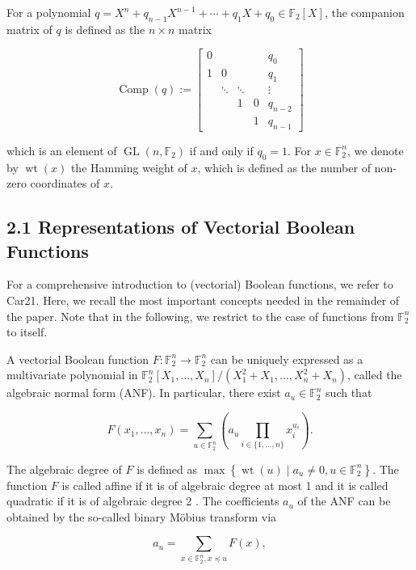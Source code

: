 \documentclass[10pt]{article}
\begin{document}
For a polynomial $q=X^{n}+q_{n-1} X^{n-1}+\cdots+q_{1} X+q_{0} \in \mathbb{F}_{2}[X]$, the companion matrix of $q$ is defined as the $n \times n$ matrix

$$
\operatorname{Comp}(q):=\left[\begin{array}{ccccc}
0 & & & & q_{0} \\
1 & 0 & & & q_{1} \\
& \ddots & \ddots & & \vdots \\
& & 1 & 0 & q_{n-2} \\
& & & 1 & q_{n-1}
\end{array}\right]
$$

which is an element of $\operatorname{GL}\left(n, \mathbb{F}_{2}\right)$ if and only if $q_{0}=1$. For $x \in \mathbb{F}_{2}^{n}$, we denote by $\operatorname{wt}(x)$ the Hamming weight of $x$, which is defined as the number of non-zero coordinates of $x$.

\subsection*{2.1 Representations of Vectorial Boolean Functions}
For a comprehensive introduction to (vectorial) Boolean functions, we refer to Car21. Here, we recall the most important concepts needed in the remainder of the paper. Note that in the following, we restrict to the case of functions from $\mathbb{F}_{2}^{n}$ to itself.

A vectorial Boolean function $F: \mathbb{F}_{2}^{n} \rightarrow \mathbb{F}_{2}^{n}$ can be uniquely expressed as a multivariate polynomial in $\mathbb{F}_{2}^{n}\left[X_{1}, \ldots, X_{n}\right] /\left(X_{1}^{2}+X_{1}, \ldots, X_{n}^{2}+X_{n}\right)$, called the algebraic normal form (ANF). In particular, there exist $a_{u} \in \mathbb{F}_{2}^{n}$ such that

$$
F\left(x_{1}, \ldots, x_{n}\right)=\sum_{u \in \mathbb{F}_{2}^{n}}\left(a_{u} \prod_{i \in\{1, \ldots, n\}} x_{i}^{u_{i}}\right) .
$$

The algebraic degree of $F$ is defined as $\max \left\{\operatorname{wt}(u) \mid a_{u} \neq 0, u \in \mathbb{F}_{2}^{n}\right\}$. The function $F$ is called affine if it is of algebraic degree at most 1 and it is called quadratic if it is of algebraic degree 2 . The coefficients $a_{u}$ of the ANF can be obtained by the so-called binary Möbius transform via


\begin{equation*}
a_{u}=\sum_{x \in \mathbb{F}_{2}^{n}, x \preceq u} F(x), \tag{1}
\end{equation*}
\end{document}
